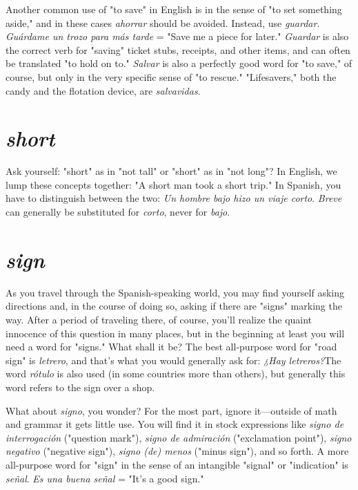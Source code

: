 Another common use of "to save" in English is in the sense of
"to set something aside," and in these cases \emph{ahorrar} should be avoided.
Instead, use \emph{guardar}. \emph{Guárdame un trozo para más tarde} = "Save me
a piece for later." \emph{Guardar} is also the correct verb for "saving" ticket
stubs, receipts, and other items, and can often be translated "to hold
on to." \emph{Salvar} is also a perfectly good word for "to save," of course, but
only in the very specific sense of "to rescue." "Lifesavers," both the
candy and the flotation device, are \emph{salvavidas}.

\section{\emph{short}}

Ask yourself: "short" as in "not tall" or "short" as in "not
long"? In English, we lump these concepts together: "A short man
took a short trip." In Spanish, you have to distinguish between the
two: \emph{Un hombre bajo hizo un viaje corto}. \emph{Breve} can generally be substituted for \emph{corto}, never for \emph{bajo}.

\section{\emph{sign}}

As you travel through the Spanish-speaking world, you may
find yourself asking directions and, in the course of doing so, asking if
there are "signs" marking the way. After a period of traveling there, of
course, you'll realize the quaint innocence of this question in many
places, but in the beginning at least you will need a word for "signs."
What shall it be? The best all-purpose word for "road sign" is \emph{letrero},
and that's what you would generally ask for: \emph{¿Hay letreros?}The word
\emph{rótulo} is also used (in some countries more than others), but generally
this word refers to the sign over a shop.

What about \emph{signo}, you wonder? For the most part, ignore it---outside of math and grammar it gets little use. You will find it in stock
expressions like \emph{signo de interrogación} ("question mark"), \emph{signo de
admiración} ("exclamation point"), \emph{signo negativo} ("negative sign"),
\emph{signo (de) menos} ("minus sign"), and so forth. A more all-purpose word
for "sign" in the sense of an intangible "signal" or "indication" is \emph{señal}.
\emph{Es una buena señal} = "It's a good sign."

